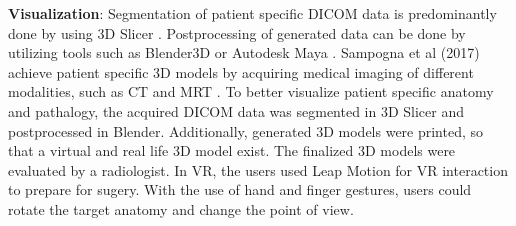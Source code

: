 \textbf{Visualization}: Segmentation of patient specific DICOM data is predominantly done by using 3D Slicer \cite{Barber.2018,Barber.2020}.
Postprocessing of generated data can be done by utilizing tools such as Blender3D or Autodesk Maya \cite{Barber.2020,Parham.2019,Sampogna.2017}.
\newline
Sampogna et al (2017) achieve patient specific 3D models by acquiring medical imaging of different modalities, such as CT and MRT \cite{Sampogna.2017}.
To better visualize patient specific anatomy and pathalogy, the acquired DICOM data was segmented in 3D Slicer and postprocessed in Blender.
Additionally, generated 3D models were printed, so that a virtual and real life 3D model exist.
The finalized 3D models were evaluated by a radiologist.
In VR, the users used Leap Motion for VR interaction to prepare for sugery.
With the use of hand and finger gestures, users could rotate the target anatomy and change the point of view.